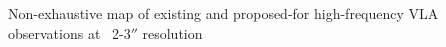 Non-exhaustive map of existing and proposed-for high-frequency VLA observations at ~2-3$''$ resolution